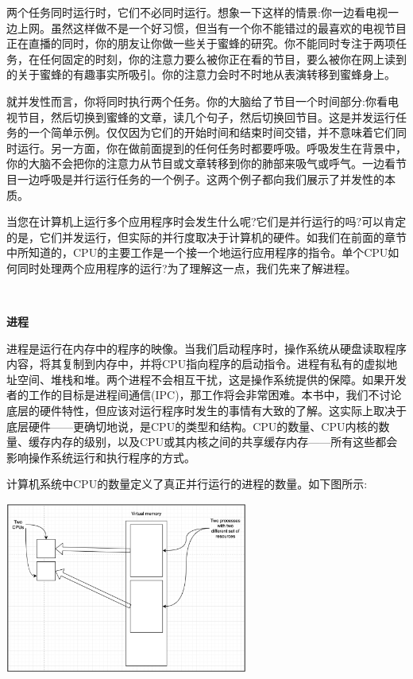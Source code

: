 两个任务同时运行时，它们不必同时运行。想象一下这样的情景:你一边看电视一边上网。虽然这样做不是一个好习惯，但当有一个你不能错过的最喜欢的电视节目正在直播的同时，你的朋友让你做一些关于蜜蜂的研究。你不能同时专注于两项任务，在任何固定的时刻，你的注意力要么被你正在看的节目，要么被你在网上读到的关于蜜蜂的有趣事实所吸引。你的注意力会时不时地从表演转移到蜜蜂身上。 \par
就并发性而言，你将同时执行两个任务。你的大脑给了节目一个时间部分:你看电视节目，然后切换到蜜蜂的文章，读几个句子，然后切换回节目。这是并发运行任务的一个简单示例。仅仅因为它们的开始时间和结束时间交错，并不意味着它们同时运行。另一方面，你在做前面提到的任何任务时都要呼吸。呼吸发生在背景中，你的大脑不会把你的注意力从节目或文章转移到你的肺部来吸气或呼气。一边看节目一边呼吸是并行运行任务的一个例子。这两个例子都向我们展示了并发性的本质。 \par
当您在计算机上运行多个应用程序时会发生什么呢?它们是并行运行的吗?可以肯定的是，它们并发运行，但实际的并行度取决于计算机的硬件。如我们在前面的章节中所知道的，CPU的主要工作是一个接一个地运行应用程序的指令。单个CPU如何同时处理两个应用程序的运行?为了理解这一点，我们先来了解进程。 \par

\noindent\textbf{}\ \par
\textbf{进程} \ \par
进程是运行在内存中的程序的映像。当我们启动程序时，操作系统从硬盘读取程序内容，将其复制到内存中，并将CPU指向程序的启动指令。进程有私有的虚拟地址空间、堆栈和堆。两个进程不会相互干扰，这是操作系统提供的保障。如果开发者的工作的目标是进程间通信(IPC)，那工作将会非常困难。本书中，我们不讨论底层的硬件特性，但应该对运行程序时发生的事情有大致的了解。这实际上取决于底层硬件——更确切地说，是CPU的类型和结构。CPU的数量、CPU内核的数量、缓存内存的级别，以及CPU或其内核之间的共享缓存内存——所有这些都会影响操作系统运行和执行程序的方式。 \par
计算机系统中CPU的数量定义了真正并行运行的进程的数量。如下图所示: \par

\begin{center}
	\includegraphics[width=0.6\textwidth]{content/Section-2/Chapter-8/2}
\end{center}

